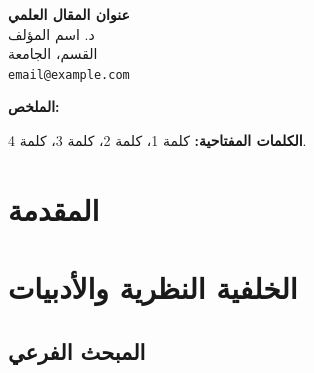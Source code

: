 \documentclass[11pt,a4paper]{article}
\begin{document}
\begin{center}
{\LARGE\bfseries عنوان المقال العلمي}\\[1em]
{\large د. اسم المؤلف}\\[0.3em]
{\small القسم، الجامعة}\\[0.3em]
{\small \texttt{email@example.com}}\\[1em]
\end{center}

\vspace{0.5em}

\begin{center}
\begin{minipage}{0.85\textwidth}
\noindent\textbf{الملخص:}

\vspace{0.5em}
\noindent\textbf{الكلمات المفتاحية:} كلمة 1، كلمة 2، كلمة 3، كلمة 4.
\end{minipage}
\end{center}

\vspace{1em}


\section{المقدمة}
\label{sec:intro}


\section{الخلفية النظرية والأدبيات}
\label{sec:background}


\subsection{المبحث الفرعي}
\end{document}
